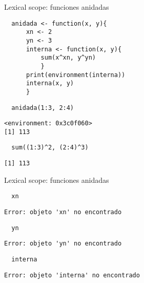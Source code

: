 \documentclass[xcolor={usenames,svgnames,dvipsnames}]{beamer}
\begin{document}
\begin{frame}[fragile,label={sec:orgheadline15}]{Lexical scope: funciones anidadas}
 \lstset{language=R,label= ,caption= ,captionpos=b,numbers=none}
\begin{lstlisting}
  anidada <- function(x, y){
      xn <- 2
      yn <- 3
      interna <- function(x, y){
          sum(x^xn, y^yn)
          }
      print(environment(interna))
      interna(x, y)
      }
\end{lstlisting}

\lstset{language=R,label= ,caption= ,captionpos=b,numbers=none}
\begin{lstlisting}
  anidada(1:3, 2:4)
\end{lstlisting}

\begin{verbatim}
<environment: 0x3c0f060>
[1] 113
\end{verbatim}

\lstset{language=R,label= ,caption= ,captionpos=b,numbers=none}
\begin{lstlisting}
  sum((1:3)^2, (2:4)^3)
\end{lstlisting}

\begin{verbatim}
[1] 113
\end{verbatim}
\end{frame}

\begin{frame}[fragile,label={sec:orgheadline16}]{Lexical scope: funciones anidadas}
 \lstset{language=R,label= ,caption= ,captionpos=b,numbers=none}
\begin{lstlisting}
  xn
\end{lstlisting}

\begin{verbatim}
Error: objeto 'xn' no encontrado
\end{verbatim}

\lstset{language=R,label= ,caption= ,captionpos=b,numbers=none}
\begin{lstlisting}
  yn
\end{lstlisting}

\begin{verbatim}
Error: objeto 'yn' no encontrado
\end{verbatim}

\lstset{language=R,label= ,caption= ,captionpos=b,numbers=none}
\begin{lstlisting}
  interna
\end{lstlisting}

\begin{verbatim}
Error: objeto 'interna' no encontrado
\end{verbatim}
\end{frame}
\end{document}
